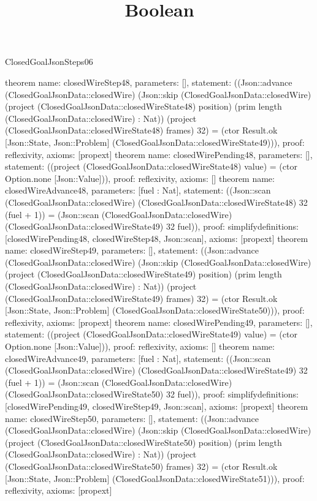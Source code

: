\begin{lexlean}{ClosedGoalJsonSteps06}
\title{Boolean}
\begin{semanticmodule}
theorem{
 name: closedWireStep48, parameters: [],
 statement: ((Json::advance (ClosedGoalJsonData::closedWire) (Json::skip (ClosedGoalJsonData::closedWire) (project (ClosedGoalJsonData::closedWireState48) position) (prim length (ClosedGoalJsonData::closedWire) : Nat)) (project (ClosedGoalJsonData::closedWireState48) frames) 32) = (ctor Result.ok [Json::State, Json::Problem] (ClosedGoalJsonData::closedWireState49))), proof: reflexivity{}, axioms: [propext]
}
theorem{
 name: closedWirePending48, parameters: [],
 statement: ((project (ClosedGoalJsonData::closedWireState48) value) = (ctor Option.none [Json::Value])), proof: reflexivity{}, axioms: []
}
theorem{
 name: closedWireAdvance48, parameters: [fuel : Nat],
 statement: ((Json::scan (ClosedGoalJsonData::closedWire) (ClosedGoalJsonData::closedWireState48) 32 (fuel + 1)) = (Json::scan (ClosedGoalJsonData::closedWire) (ClosedGoalJsonData::closedWireState49) 32 fuel)), proof: simplify{definitions: [closedWirePending48, closedWireStep48, Json::scan]}, axioms: [propext]
}
theorem{
 name: closedWireStep49, parameters: [],
 statement: ((Json::advance (ClosedGoalJsonData::closedWire) (Json::skip (ClosedGoalJsonData::closedWire) (project (ClosedGoalJsonData::closedWireState49) position) (prim length (ClosedGoalJsonData::closedWire) : Nat)) (project (ClosedGoalJsonData::closedWireState49) frames) 32) = (ctor Result.ok [Json::State, Json::Problem] (ClosedGoalJsonData::closedWireState50))), proof: reflexivity{}, axioms: [propext]
}
theorem{
 name: closedWirePending49, parameters: [],
 statement: ((project (ClosedGoalJsonData::closedWireState49) value) = (ctor Option.none [Json::Value])), proof: reflexivity{}, axioms: []
}
theorem{
 name: closedWireAdvance49, parameters: [fuel : Nat],
 statement: ((Json::scan (ClosedGoalJsonData::closedWire) (ClosedGoalJsonData::closedWireState49) 32 (fuel + 1)) = (Json::scan (ClosedGoalJsonData::closedWire) (ClosedGoalJsonData::closedWireState50) 32 fuel)), proof: simplify{definitions: [closedWirePending49, closedWireStep49, Json::scan]}, axioms: [propext]
}
theorem{
 name: closedWireStep50, parameters: [],
 statement: ((Json::advance (ClosedGoalJsonData::closedWire) (Json::skip (ClosedGoalJsonData::closedWire) (project (ClosedGoalJsonData::closedWireState50) position) (prim length (ClosedGoalJsonData::closedWire) : Nat)) (project (ClosedGoalJsonData::closedWireState50) frames) 32) = (ctor Result.ok [Json::State, Json::Problem] (ClosedGoalJsonData::closedWireState51))), proof: reflexivity{}, axioms: [propext]
}
\end{semanticmodule}
\end{lexlean}
